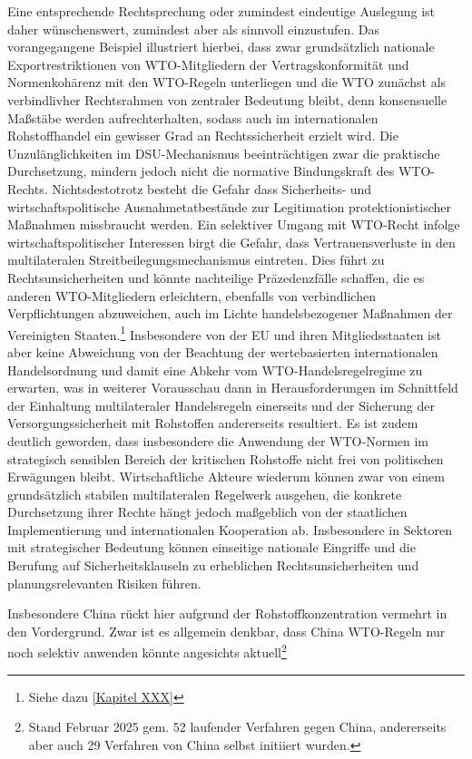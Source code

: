 \documentclass[12pt,a4paper,oneside]{book} %
\begin{document}
{	Eine entsprechende Rechtsprechung oder zumindest eindeutige Auslegung ist daher wünschenswert, zumindest aber als sinnvoll einzustufen.
	Das vorangegangene Beispiel illustriert hierbei, dass zwar grundsätzlich nationale Exportrestriktionen von WTO-Mitgliedern der Vertragskonformität und Normenkohärenz mit den WTO-Regeln unterliegen und die WTO zunächst als verbindlivher Rechtsrahmen von zentraler Bedeutung bleibt, denn konsensuelle Maßstäbe werden aufrechterhalten, sodass auch im internationalen Rohstoffhandel ein gewisser Grad an Rechtssicherheit erzielt wird. Die Unzulänglichkeiten im DSU-Mechanismus beeinträchtigen zwar die praktische Durchsetzung, mindern jedoch nicht die normative Bindungskraft des WTO-Rechts. Nichtsdestotrotz besteht die Gefahr dass Sicherheits- und wirtschaftspolitische Ausnahmetatbestände zur Legitimation protektionistischer Maßnahmen missbraucht werden. Ein selektiver Umgang mit WTO-Recht infolge wirtschaftspolitischer Interessen birgt die Gefahr, dass Vertrauensverluste in den multilateralen Streitbeilegungsmechanismus eintreten. Dies führt zu Rechtsunsicherheiten und könnte nachteilige Präzedenzfälle schaffen, die es anderen WTO-Mitgliedern erleichtern, ebenfalls von verbindlichen Verpflichtungen abzuweichen, auch im Lichte handelsbezogener Maßnahmen der Vereinigten Staaten.\footnote{Siehe dazu \ref{Kapitel XXX}} Insbesondere von der EU und ihren Mitgliedsstaaten ist aber keine Abweichung von der Beachtung der wertebasierten internationalen Handelsordnung und damit eine Abkehr vom WTO-Handelsregelregime zu erwarten, was in weiterer Vorausschau dann in Herausforderungen im Schnittfeld der Einhaltung multilateraler Handelsregeln einerseits und der Sicherung der Versorgungssicherheit mit Rohstoffen andererseits resultiert. Es ist zudem deutlich geworden, dass insbesondere die Anwendung der WTO-Normen im strategisch sensiblen Bereich der kritischen Rohstoffe nicht frei von politischen Erwägungen bleibt. Wirtschaftliche Akteure wiederum können zwar von einem grundsätzlich stabilen multilateralen Regelwerk ausgehen, die konkrete Durchsetzung ihrer Rechte hängt jedoch maßgeblich von der staatlichen Implementierung und internationalen Kooperation ab. Insbesondere in Sektoren mit strategischer Bedeutung können einseitige nationale Eingriffe und die Berufung auf Sicherheitsklauseln zu erheblichen Rechtsunsicherheiten und planungsrelevanten Risiken führen.
	
	Insbesondere China rückt hier aufgrund der Rohstoffkonzentration vermehrt in den Vordergrund. Zwar ist es allgemein denkbar, dass China WTO-Regeln nur noch selektiv anwenden könnte angesichts aktuell\footnote{Stand Februar 2025 gem. %
	52 laufender Verfahren gegen China, andererseits aber auch 29 Verfahren von China selbst initiiert wurden.
	
}}
\end{document}
